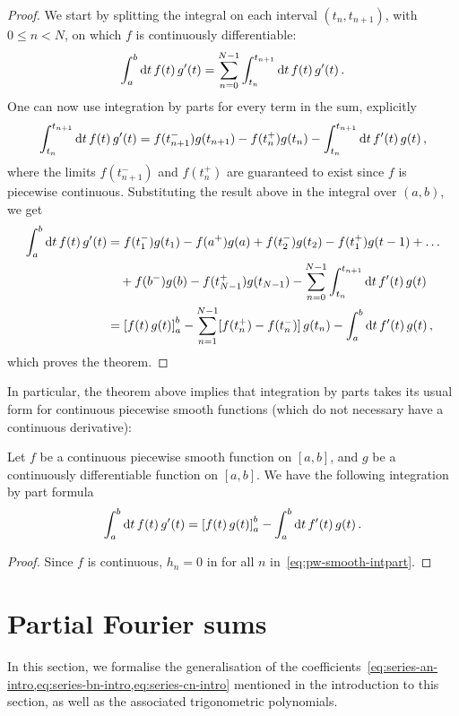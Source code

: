 \begin{proof}
	We start by splitting the integral on each interval $(t_n,t_{n+1})$, with $0\leq n<N$,
	on which $f$ is continuously differentiable:
	\begin{equation}
		\int_a^b\mathrm{d} t\, f(t)\,g'(t)
		=\sum_{n=0}^{N-1}\int_{t_n}^{t_{n+1}}\mathrm{d} t\, f(t)\,g'(t)\,.
	\end{equation}
	One can now use integration by parts for every term in the sum, explicitly
	\begin{equation}
		\int_{t_n}^{t_{n+1}}\mathrm{d} t\, f(t)\,g'(t)=
		f(t_{n+1}^-)g(t_{n+1})-f(t_n^+)g(t_n)-\int_{t_n}^{t_{n+1}}\mathrm{d} t\, f'(t)\,g(t)\,,
	\end{equation}
	where the limits $f(t_{n+1}^-)$ and $f(t_n^+)$ are guaranteed to exist since $f$ is
	piecewise continuous. Substituting the result above in the integral over $(a,b)$, we get
	\begin{align}
		\int_a^b\mathrm{d} t\, f(t)\,g'(t)
		 & =f(t_1^-)g(t_1)-f(a^+)g(a)+f(t_2^-)g(t_2)
		-f(t_1^+)g(t-1)+\dots\notag                                                 \\
		 & \quad+f(b^-)g(b)-f(t_{N-1}^+)g(t_{N-1})-
		\sum_{n=0}^{N-1}\int_{t_n}^{t_{n+1}}\mathrm{d} t\, f'(t)\,g(t)                   \\
		 & =\left[f(t)\,g(t)\right]_a^b-\sum_{n=1}^{N-1}[f(t_n^+)-f(t_n^-)]\,g(t_n)
		-\int_a^b\mathrm{d} t\, f'(t)\,g(t)\,,
	\end{align}
	which proves the theorem.
\end{proof}
In particular, the theorem above implies that integration by parts takes its usual form
for continuous piecewise smooth functions (which do not necessary have a continuous
derivative):
\begin{corollary}
	Let $f$ be a continuous piecewise smooth function on $[a,b]$, and $g$ be a continuously
	differentiable function on $[a,b]$. We have the following integration by part formula
	\begin{equation}
		\int_a^b\mathrm{d} t\,f(t)\,g'(t)=\left[f(t)\,g(t)\right]_a^b
		-\int_a^b\mathrm{d} t\, f'(t)\,g(t)\,.
	\end{equation}
\end{corollary}
\begin{proof}
	Since $f$ is continuous, $h_n=0$ in for all $n$ in~\cref{eq:pw-smooth-intpart}.
\end{proof}

\section{Partial Fourier sums}
In this section, we formalise the generalisation of the
coefficients~\cref{eq:series-an-intro,eq:series-bn-intro,eq:series-cn-intro} mentioned in
the introduction to this section, as well as the associated trigonometric polynomials.

